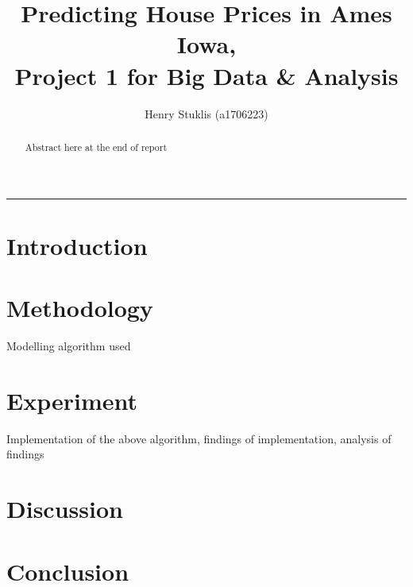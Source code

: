 \documentclass[a4paper, twocolumn]{article}
\begin{document}
\title{Predicting House Prices in Ames Iowa, \\ Project 1 for Big Data \& Analysis}
\author{Henry Stuklis (a1706223)}
\maketitle
\begin{center}
\rule{\textwidth}{0.5pt}
\end{center}

\begin{abstract}
    Abstract here at the end of report
\end{abstract}

\section{Introduction}

\section{Methodology}
    Modelling algorithm used

\section{Experiment}
    Implementation of the above algorithm, findings of implementation, analysis of findings

\section{Discussion}

\section{Conclusion}
\end{document}
